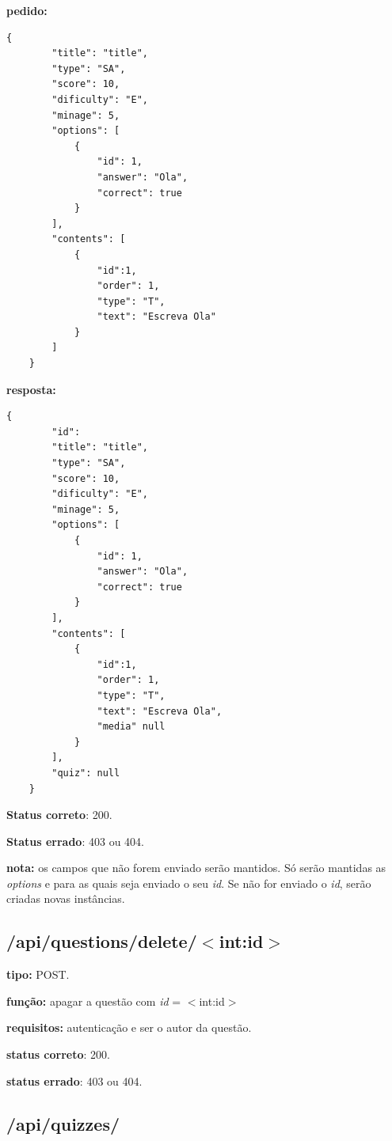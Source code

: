 \documentclass[11pt,a4paper]{report}
\begin{document}
\textbf{pedido:}

\begin{lstlisting}[style = code]
   {
        "title": "title",
        "type": "SA",
        "score": 10,
        "dificulty": "E",
        "minage": 5,
        "options": [
            {
                "id": 1,
                "answer": "Ola",
                "correct": true
            }
        ],
        "contents": [
            {
                "id":1,
                "order": 1,
                "type": "T",
                "text": "Escreva Ola"
            }
        ]
    }
\end{lstlisting}

\textbf{resposta:}

\begin{lstlisting}[style = code]
{
        "id":
        "title": "title",
        "type": "SA",
        "score": 10,
        "dificulty": "E",
        "minage": 5,
        "options": [
            {
                "id": 1,
                "answer": "Ola",
                "correct": true
            }
        ],
        "contents": [
            {
                "id":1,
                "order": 1,
                "type": "T",
                "text": "Escreva Ola",
                "media" null
            }
        ],
        "quiz": null
    }
\end{lstlisting}

\textbf{Status correto}: 200.

\textbf{Status errado}: 403 ou 404.

\textbf{nota:} os campos que não forem enviado serão mantidos. Só serão mantidas as \emph{options} e  para as quais seja enviado o seu \emph{id}. Se não for enviado o \emph{id}, serão criadas novas instâncias. 

\subsection{/api/questions/delete/$<$int:id$>$}

\textbf{tipo:} POST.

\textbf{função:} apagar a questão com \emph{id} = $<$int:id$>$

\textbf{requisitos:} autenticação e ser o autor da questão.

\textbf{status correto}: 200.

\textbf{status errado}: 403 ou 404.


\subsection{/api/quizzes/}
\end{document}
